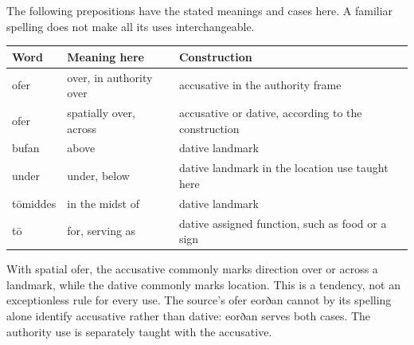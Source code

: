 The following prepositions have the stated meanings and cases here. A familiar spelling does not make all its uses interchangeable.

\par\begingroup
\fontsize{10.5}{13.2}\selectfont
\setlength{\LTleft}{0pt}\setlength{\LTright}{\fill}
\noindent
\begin{tabular}{@{}>{\raggedright\arraybackslash}p{21.58mm}>{\raggedright\arraybackslash}p{33.02mm}>{\raggedright\arraybackslash}p{63.77mm}@{}}
\toprule
\textbf{Word} & \textbf{Meaning here} & \textbf{Construction} \\
\midrule
ofer & over, in authority over & accusative in the authority frame \\
ofer & spatially over, across & accusative or dative, according to the construction \\
bufan & above & dative landmark \\
under & under, below & dative landmark in the location use taught here \\
tōmiddes & in the midst of & dative landmark \\
tō & for, serving as & dative assigned function, such as food or a sign \\
\bottomrule
\end{tabular}
\par\endgroup

With spatial ofer, the accusative commonly marks direction over or across a landmark, while the dative commonly marks location. This is a tendency, not an exceptionless rule for every use. The source’s ofer eorðan cannot by its spelling alone identify accusative rather than dative: eorðan serves both cases. The authority use is separately taught with the accusative.

